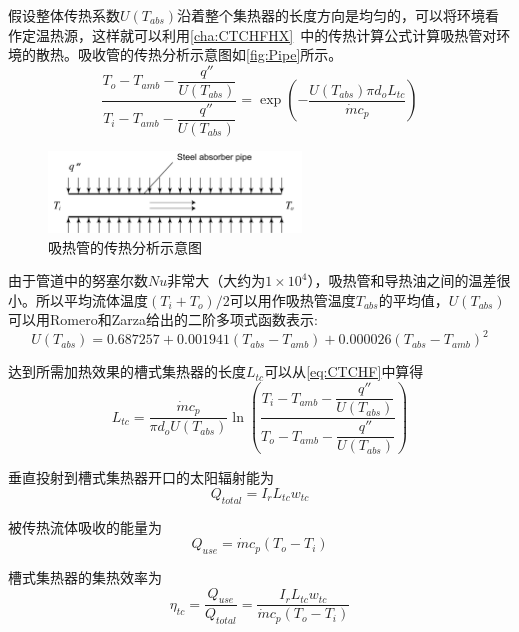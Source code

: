 假设整体传热系数$U(T_{abs})$沿着整个集热器的长度方向是均匀的，可以将环境看作定温热源，这样就可以利用\autoref{cha:CTCHFHX}~中的传热计算公式计算吸热管对环境的散热。吸收管的传热分析示意图如\autoref{fig:Pipe}所示。
\begin{equation}
	\frac{T_{o}-T_{amb}-\dfrac{q''}{U(T_{abs})}}{T_{i}-T_{amb}-\dfrac{q''}{U(T_{abs})}}=\exp(-\frac{U(T_{abs})\pi d_o L_{tc}}{\dot{m}c_{p}})\label{eq:CTCHF}
\end{equation}

\begin{figure}[!ht]
\centering
\includegraphics[width=0.6\textwidth]{fig/Pipe.pdf}
\caption{吸热管的传热分析示意图}\label{fig:Pipe}
\end{figure}

由于管道中的努塞尔数$Nu$非常大（大约为$1\times10^4$），吸热管和导热油之间的温差很小。所以平均流体温度$(T_{i}+T_{o})/2$可以用作吸热管温度$T_{abs}$的平均值，$U(T_{abs})$可以用Romero和Zarza给出的二阶多项式函数表示\cite{Romero2007}:
\begin{equation}
	U(T_{abs}) = 0.687257 + 0.001941(T_{abs} - T_{amb}) + 0.000026(T_{abs} - T_{amb})^2
\end{equation}

达到所需加热效果的槽式集热器的长度$L_{tc}$可以从\autoref{eq:CTCHF}中算得
\begin{equation}
	L_{tc} = \dfrac{\dot{m}c_p}{\pi d_o U(T_{abs})}\ln\left(\dfrac{T_i-T_{amb}-\dfrac{q''}{U(T_{abs})}}{T_o-T_{amb}-\dfrac{q''}{U(T_{abs})}}\right)
	\label{eq:get_L}
\end{equation}

垂直投射到槽式集热器开口的太阳辐射能为
\begin{equation}
  Q_{total} = I_r L_{tc} w_{tc}
\end{equation}

被传热流体吸收的能量为
\begin{equation}
  Q_{use} = \dot{m}c_p(T_o - T_i)
\end{equation}

槽式集热器的集热效率为
\begin{equation}
  \eta_{tc} = \dfrac{Q_{use}}{Q_{total}} = 
  \dfrac{I_r L_{tc} w_{tc}}{\dot{m}c_p(T_o - T_i)}
  \label{eq:eta_tc}
\end{equation}


